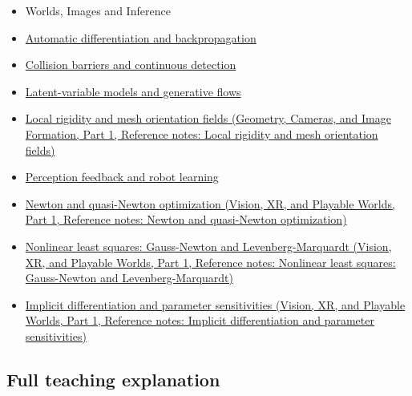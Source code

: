 \begin{itemize}
\item
  {Worlds, Images and Inference}
\item
  \hyperref[appendix-40df0855b4a7]{Automatic differentiation and backpropagation}
\item
  \hyperref[appendix-a9ba01fa72a6]{Collision barriers and continuous detection}
\item
  \hyperref[appendix-2c568f05ee34]{Latent-variable models and generative flows}
\item
  \href{../03-Geometry-Cameras-and-Image-Formation-P01/main.pdf\#nameddest=appendix-7107009c505b}{Local rigidity and mesh orientation fields (Geometry, Cameras, and Image Formation, Part 1, Reference notes: Local rigidity and mesh orientation fields)}
\item
  \hyperref[appendix-b0c42da325f1]{Perception feedback and robot learning}
\item
  \href{../07-Vision-XR-and-Playable-Worlds-P01/main.pdf\#nameddest=appendix-54c8f5828387}{Newton and quasi-Newton optimization (Vision, XR, and Playable Worlds, Part 1, Reference notes: Newton and quasi-Newton optimization)}
\item
  \href{../07-Vision-XR-and-Playable-Worlds-P01/main.pdf\#nameddest=appendix-2c2df8345991}{Nonlinear least squares: Gauss-Newton and Levenberg-Marquardt (Vision, XR, and Playable Worlds, Part 1, Reference notes: Nonlinear least squares: Gauss-Newton and Levenberg-Marquardt)}
\item
  \href{../07-Vision-XR-and-Playable-Worlds-P01/main.pdf\#nameddest=appendix-8836553d56fc}{Implicit differentiation and parameter sensitivities (Vision, XR, and Playable Worlds, Part 1, Reference notes: Implicit differentiation and parameter sensitivities)}
\end{itemize}

\subsection{Full teaching explanation}\label{appendix-29f4bea4c2bb-full-teaching-explanation}

\hypertarget{appendix-29f4bea4c2bb-full-teaching-explanation}{}

